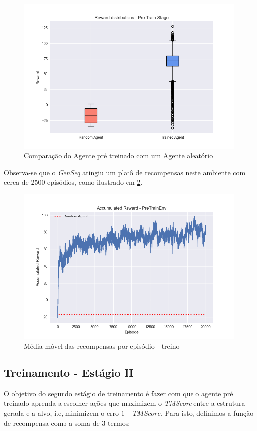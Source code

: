   \begin{figure}[H]
    \centering
    \includegraphics[width=.8\linewidth]{figuras/plot_box_pre_train_reward.jpg}  
    \caption{Comparação do Agente pré treinado com um Agente aleatório}
    \label{fig:box-pre-train}
  \end{figure}

Observa-se que o \textit{GenSeq} atingiu um platô de recompensas neste ambiente com cerca de 2500 episódios, como ilustrado em 
\ref{fig:rew_per_ep_pretrain}.

  \begin{figure}[H]
    \centering
    \includegraphics[width=.8\linewidth]{figuras/plot_pre_train_reward.jpg}    
    \caption{Média móvel das recompensas por episódio - treino}
    \label{fig:rew_per_ep_pretrain}
  \end{figure}


\subsection{Treinamento - Estágio II}
\label{subsection:stage2}
O objetivo do segundo estágio de treinamento é fazer com que o agente pré treinado aprenda a escolher ações
que maximizem o \textit{TMScore} entre a estrutura gerada e a alvo, 
i.e, minimizem o erro $1-TMScore$.
Para isto, definimos a função de recompensa como a soma de 3 termos: 

